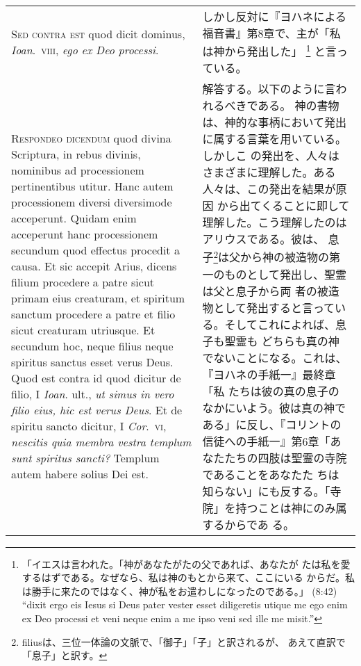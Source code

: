 \documentclass[10pt]{jsarticle} %
\begin{document}
\begin{longtable}{p{21em}p{21em}}
{\scshape Sed contra est} quod dicit dominus, {\itshape Ioan}.~{\scshape viii}, {\itshape ego ex Deo processi}.


&

しかし反対に『ヨハネによる福音書』第8章で、主が「私は神から発出した」
 \footnote{「イエスは言われた。「神があなたがたの父であれば、あなたが
 たは私を愛するはずである。なぜなら、私は神のもとから来て、ここにいる
 からだ。私は勝手に来たのではなく、神が私をお遣わしになったのである。」
 (8:42) ``dixit ergo eis Iesus si Deus pater vester esset diligeretis
 utique me ego enim ex Deo processi et veni neque enim a me ipso veni
 sed ille me misit.''} と言っている。


\\



{\scshape Respondeo dicendum} quod divina Scriptura, in rebus divinis, nominibus ad
processionem pertinentibus utitur. Hanc autem processionem diversi
diversimode acceperunt. Quidam enim acceperunt hanc processionem
secundum quod effectus procedit a causa. Et sic accepit Arius, dicens
filium procedere a patre sicut primam eius creaturam, et spiritum
sanctum procedere a patre et filio sicut creaturam utriusque. Et
secundum hoc, neque filius neque spiritus sanctus esset verus Deus. Quod
est contra id quod dicitur de filio, I {\itshape Ioan}. ult., {\itshape ut simus in vero
filio eius, hic est verus Deus}. Et de spiritu sancto dicitur, I {\itshape Cor}.~{\scshape vi},
{\itshape nescitis quia membra vestra templum sunt spiritus sancti?} Templum autem
habere solius Dei est. 



&

解答する。以下のように言われるべきである。
神の書物は、神的な事柄において発出に属する言葉を用いている。しかしこ
 の発出を、人々はさまざまに理解した。ある人々は、この発出を結果が原因
 から出てくることに即して理解した。こう理解したのはアリウスである。彼は、
 息子\footnote{filiusは、三位一体論の文脈で、「御子」「子」と訳されるが、
 あえて直訳で「息子」と訳す。}は父から神の被造物の第一のものとして発出し、聖霊は父と息子から両
 者の被造物として発出すると言っている。そしてこれによれば、息子も聖霊も
 どちらも真の神でないことになる。これは、『ヨハネの手紙一』最終章「私
 たちは彼の真の息子のなかにいよう。彼は真の神である」に反し、『コリントの
 信徒への手紙一』第6章「あなたたちの四肢は聖霊の寺院であることをあなたた
 ちは知らない」にも反する。「寺院」を持つことは神にのみ属するからであ
 る。


\\



\end{longtable}
\end{document}
